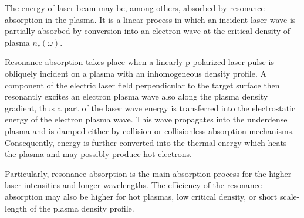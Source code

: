 The energy of laser beam may be, among others, absorbed by resonance absorption in the plasma. It is a linear process in which an incident laser wave is partially absorbed by conversion into an electron wave at the critical density of plasma $ n_c (\omega) $.

Resonance absorption takes place when a linearly p-polarized laser pulse is obliquely incident on a plasma with an inhomogeneous density profile. A component of the electric laser field perpendicular to the target surface then resonantly excites an electron plasma wave also along the plasma density gradient, thus a part of the laser wave energy is transferred into the electrostatic energy of the electron plasma wave. This wave propagates into the underdense plasma and is damped either by collision or collisionless absorption mechanisms. Consequently, energy is further converted into the thermal energy which heats the plasma and may possibly produce hot electrons.

Particularly, resonance absorption is the main absorption process for the higher laser intensities and longer wavelengths. The efficiency of the resonance absorption may also be higher for hot plasmas, low critical density, or short scale-length of the plasma density profile.
